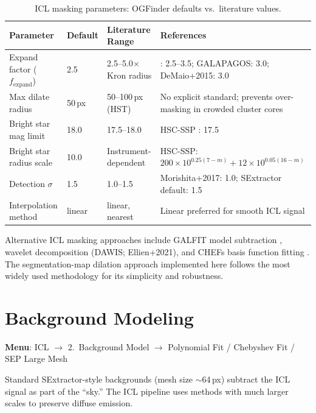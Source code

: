 \documentclass[11pt,fleqn]{book}
\begin{document}
\begin{table}[htbp]
\centering
\caption{ICL masking parameters: OGFinder defaults vs.\ literature values.}
\label{tab:icl-mask-params}
\begin{tabular}{L{2.8cm} C{1.8cm} L{3.5cm} L{4.5cm}}
\toprule
\textbf{Parameter} & \textbf{Default} & \textbf{Literature Range} & \textbf{References} \\
\midrule
Expand factor ($f_\mathrm{expand}$) & 2.5 & 2.5--5.0$\times$ Kron radius & \parencite{kluge2020}: 2.5--3.5; GALAPAGOS: 3.0; DeMaio+2015: 3.0 \\
\midrule
Max dilate radius & 50\,px & 50--100\,px (HST) & No explicit standard; prevents over-masking in crowded cluster cores \\
\midrule
Bright star mag limit & 18.0 & 17.5--18.0 & HSC-SSP \parencite{huang2018}: 17.5 \\
\midrule
Bright star radius scale & 10.0 & Instrument-dependent & HSC-SSP: $200 \times 10^{0.25(7-m)} + 12 \times 10^{0.05(16-m)}$ \\
\midrule
Detection $\sigma$ & 1.5 & 1.0--1.5 & Morishita+2017: 1.0; SExtractor default: 1.5 \\
\midrule
Interpolation method & linear & linear, nearest & Linear preferred for smooth ICL signal \\
\bottomrule
\end{tabular}
\end{table}

Alternative ICL masking approaches include GALFIT model subtraction \parencite{montes2018}, wavelet decomposition (DAWIS; Ellien+2021), and CHEFs basis function fitting \parencite{jimenez-teja2018}.  The segmentation-map dilation approach implemented here follows the most widely used methodology for its simplicity and robustness.


\section{Background Modeling}
\label{sec:icl-bkg}

\textbf{Menu}: ICL $\to$ 2.\ Background Model $\to$ Polynomial Fit / Chebyshev Fit / SEP Large Mesh

Standard SExtractor-style backgrounds (mesh size $\sim$64\,px) subtract the ICL signal as part of the ``sky.''  The ICL pipeline uses methods with much larger scales to preserve diffuse emission.
\end{document}
